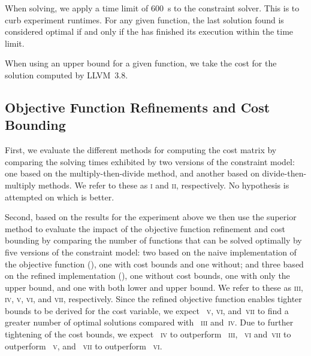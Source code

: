 When solving, we apply a time limit of \SI{600}{\s} to the \gls{constraint
  solver}.
%
This is to curb experiment runtimes.
%
For any given \gls{function}, the last \gls{solution} found is considered
optimal if and only if the  has finished its
execution within the time limit.

When using an upper bound for a given \gls{function}, we take the cost for the
\gls{solution} computed by \mbox{\gls{LLVM} 3.8}.


\subsection{Objective Function Refinements and Cost Bounding}

\def\modelA{\textsc{i}}
\def\modelB{\textsc{ii}}

First, we evaluate the different methods for computing the cost matrix by
comparing the solving times exhibited by two versions of the \gls{constraint
  model}: one based on the \gls{multiply-then-divide method}, and another based
on \glspl{divide-then-multiply method}.
%
We refer to these  as \modelA{} and \modelB,
respectively.
%
No hypothesis is attempted on which  is better.

\def\modelC{\textsc{iii}}
\def\modelD{\textsc{iv}}
\def\modelE{\textsc{v}}
\def\modelF{\textsc{vi}}
\def\modelG{\textsc{vii}}

Second, based on the results for the experiment above we then use the superior
method to evaluate the impact of the \gls{objective function} refinement and
cost bounding by comparing the number of \glspl{function} that can be solved
optimally by five versions of the \gls{constraint model}: two based on the naive
implementation of the \gls{objective function}
(), one with cost bounds and one without;
and three based on the refined implementation
(), one without cost
bounds, one with only the upper bound, and one with both lower and upper bound.
%
We refer to these  as \modelC, \modelD, \modelE,
\modelF, and \modelG, respectively.
%
Since the refined \gls{objective function} enables tighter bounds to be derived
for the \gls{cost variable}, we expect ~\modelE,
\modelF, and~\modelG{} to find a greater number of optimal \glspl{solution}
compared with ~\modelC{} and~\modelD.
%
Due to further tightening of the cost bounds, we expect ~\modelD{} to outperform ~\modelC{},
~\modelF{} and~\modelG{} to outperform
~\modelE, and ~\modelG{}
to outperform ~\modelF.

